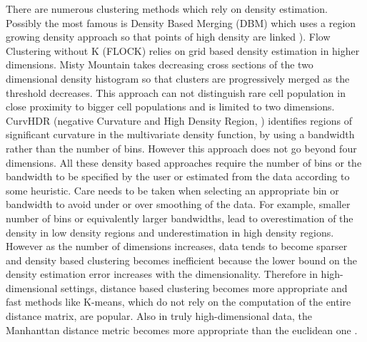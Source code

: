 There are numerous clustering methods which rely on density estimation.
Possibly the most famous is Density Based Merging (DBM) which uses a region growing density approach so that points of high density are linked \cite{Walther:2009gn}).
Flow Clustering without K (FLOCK) \citep{Qian:2010ep} relies on grid based density estimation in higher dimensions.
Misty Mountain \citep{Sugar:2010jf} takes decreasing cross sections of the two dimensional density histogram so that clusters are progressively merged as the threshold decreases.
This approach can not distinguish rare cell population in close proximity to bigger cell populations and is limited to two dimensions.
CurvHDR (negative Curvature and High Density Region, \citet{Naumann:2010fp}) identifies regions of significant curvature in the multivariate density function,
by using a bandwidth rather than the number of bins.
However this approach does not go beyond four dimensions.
All these density based approaches require the number of bins or the bandwidth to be specified by the user or estimated from the data according to some heuristic.
Care needs to be taken when selecting an appropriate bin or bandwidth to avoid under or over smoothing of the data.
For example, smaller number of bins or equivalently larger bandwidths, lead to overestimation of the density in low density regions and underestimation in high density regions.
However as the number of dimensions increases, data tends to become sparser
and density based clustering becomes inefficient because the lower bound on the density estimation error increases with the dimensionality.
Therefore in high-dimensional settings, distance based clustering becomes more appropriate and
fast methods like K-means, which do not rely on the computation of the entire distance matrix, are popular.
Also in truly high-dimensional data, the Manhanttan distance metric becomes more appropriate than the euclidean one \citep{Aggarwal:2001tg}.

